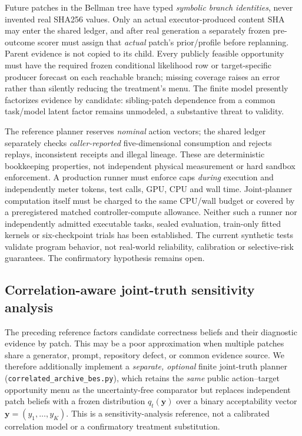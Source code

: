 \documentclass[pdflatex,sn-basic]{sn-jnl}
\begin{document}
Future patches in the Bellman tree have typed
\emph{symbolic branch identities}, never invented real SHA256
values. Only an actual executor-produced content SHA may
enter the shared ledger, and after real generation a separately
frozen pre-outcome scorer must assign that \emph{actual}
patch's prior/profile before replanning. Parent evidence is
not copied to its child. Every publicly feasible opportunity
must have the required frozen conditional likelihood row or
target-specific producer forecast on each reachable branch;
missing coverage raises an error rather than silently
reducing the treatment's menu. The finite model presently
factorizes evidence by candidate: sibling-patch dependence
from a common task/model latent factor remains unmodeled,
a substantive threat to validity.

The reference planner reserves \emph{nominal} action vectors;
the shared ledger separately checks \emph{caller-reported}
five-dimensional consumption and rejects replays,
inconsistent receipts and illegal lineage. These are
deterministic bookkeeping properties, not independent
physical measurement or hard sandbox enforcement. A
production runner must enforce caps \emph{during} execution
and independently meter tokens, test calls, GPU, CPU and
wall time. Joint-planner computation itself must be
charged to the same CPU/wall budget or covered by a
preregistered matched controller-compute allowance.
Neither such a runner nor independently admitted
executable tasks, sealed evaluation, train-only fitted
kernels or six-checkpoint trials has been established.
The current synthetic tests validate program behavior,
not real-world reliability, calibration or selective-risk
guarantees. The confirmatory hypothesis remains open.

\subsection{Correlation-aware joint-truth sensitivity analysis}
\label{sec:correlated-archive}

The preceding reference factors candidate correctness beliefs
and their diagnostic evidence by patch. This may be a poor
approximation when multiple patches share a generator,
prompt, repository defect, or common evidence source.
We therefore additionally implement a \emph{separate,
optional} finite joint-truth planner
(\texttt{correlated\_archive\_bes.py}), which retains the
\emph{same} public action--target opportunity menu as the
uncertainty-free comparator but replaces independent patch
beliefs with a frozen distribution
$q_t(\mathbf y)$ over a binary acceptability vector
$\mathbf y=(y_1,\ldots,y_K)$.
This is a sensitivity-analysis reference, not a calibrated
correlation model or a confirmatory treatment substitution.
\end{document}
